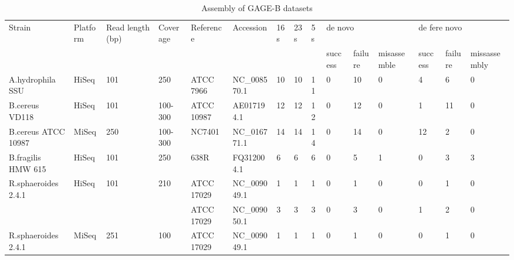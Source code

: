 \documentclass[11pt]{article}
\begin{document}
\begin{linenumbers}
\begin{table}[]
\centering
\caption{Assembly of GAGE-B datasets}
\label{gageb}
\begin{tabular}{lllllllllllllll}
Strain                                 & Platform               & Read length (bp)     & Coverage             & Reference          & Accession    & 16s & 23s & 5s & \multicolumn{3}{l}{de novo}     & \multicolumn{3}{l}{de fere novo} \\
                                       &                        &                      &                      &                    &              &     &     &    & success & failure & misassemble & success & failure & missassembly \\
A.hydrophila SSU                       & HiSeq                  & 101                  & 250                  & ATCC 7966          & NC\_008570.1 & 10  & 10  & 11 & 0       & 10      & 0           & 4       & 6       & 0            \\
B.cereus VD118                         & HiSeq                  & 101                  & 100-300              & ATCC 10987         & AE017194.1   & 12  & 12  & 12 & 0       & 12      & 0           & 1       & 11      & 0            \\
B.cereus ATCC 10987                    & MiSeq                  & 250                  & 100-300              & NC7401             & NC\_016771.1 & 14  & 14  & 14 & 0       & 14      & 0           & 12      & 2       & 0            \\
B.fragilis HMW 615                     & HiSeq                  & 101                  & 250                  & 638R               & FQ312004.1   & 6   & 6   & 6  & 0       & 5       & 1           & 0       & 3       & 3            \\
\multirow{2}{*}{R.sphaeroides 2.4.1}   & \multirow{2}{*}{HiSeq} & \multirow{2}{*}{101} & \multirow{2}{*}{210} & ATCC 17029         & NC\_009049.1 & 1   & 1   & 1  & 0       & 1       & 0           & 0       & 1       & 0            \\
                                       &                        &                      &                      & ATCC 17029         & NC\_009050.1 & 3   & 3   & 3  & 0       & 3       & 0           & 1       & 2       & 0            \\
\multirow{2}{*}{R.sphaeroides 2.4.1}   & \multirow{2}{*}{MiSeq} & \multirow{2}{*}{251} & \multirow{2}{*}{100} & ATCC 17029         & NC\_009049.1 & 1   & 1   & 1  & 0       & 1       & 0           & 0       & 1       & 0            \\

\end{tabular}
\end{table}
\end{linenumbers}
\end{document}
